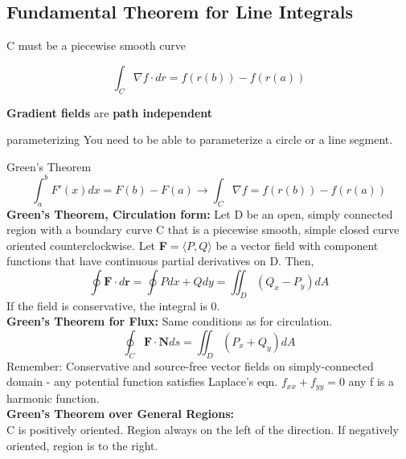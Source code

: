 \documentclass[a4paper, 12pt]{article}
\begin{document}
\subsection{Fundamental Theorem for Line Integrals}
C must be a piecewise smooth curve

\begin{equation}
	\label{}
\int_{C}\nabla f \cdot dr = f(r(b))-f(r(a))	
\end{equation}


\textbf{Gradient fields} are \textbf{path independent}

\begin{subsection}{parameterizing}
You need to be able to parameterize a circle or a line segment.

\end{subsection}
\begin{section}{Green's Theorem}
\begin{equation} 
\int_{a}^{b}F'(x)dx=F(b)-F(a) \to \int_{C}\nabla f=f(r(b))-f(r(a))
\end{equation}
\textbf{Green's Theorem, Circulation form:} Let D be an open, simply connected region with a boundary curve C that is a piecewise smooth, simple closed curve oriented counterclockwise.
Let \textbf{F}$=\langle P,Q\rangle$ be a vector field with component functions that have continuous partial derivatives on D. Then,
\begin{equation} 
\oint \textbf{F}\cdot d\textbf{r}=\oint Pdx+Qdy=\iint_{D}(Q_{x}-P_{y})dA
\end{equation}
If the field is conservative, the integral is 0.\\
\textbf{Green's Theorem for Flux:} Same conditions as for circulation.
\begin{equation}
\oint_{C}\textbf{F}\cdot\textbf{N}ds=\iint_{D}(P_{x}+Q_{y})dA
\end{equation}
Remember: Conservative and source-free vector fields on simply-connected domain - any potential function satisfies Laplace's eqn. 
$f_{xx}+f_{yy}=0$ any f is a harmonic function.\\
\textbf{Green's Theorem over General Regions:} \\
C is positively oriented. Region always on the left of the direction. If 
negatively oriented, region is to the right.\\
\end{section}
\end{document}
